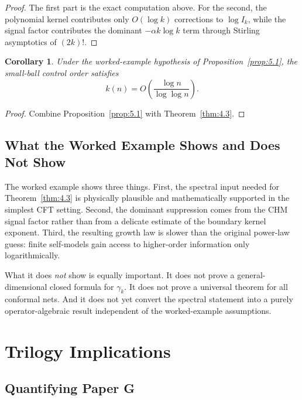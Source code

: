 \documentclass[12pt]{article}
\newtheorem{corollary}[theorem]{Corollary}
\theoremstyle{definition}
\theoremstyle{remark}
\begin{document}
\begin{proof}
The first part is the exact computation above. For the second, the
polynomial kernel contributes only \(O(\log k)\) corrections to
\(\log I_k\), while the signal factor contributes the dominant
\(-\alpha k\log k\) term through Stirling asymptotics of \((2k)!\).
\end{proof}

\begin{corollary}\label{cor:5.2}
Under the worked-example hypothesis of
Proposition~\ref{prop:5.1}, the small-ball control order satisfies
\[
k(n)=O\!\left(\frac{\log n}{\log\log n}\right).
\]
\end{corollary}

\begin{proof}
Combine Proposition~\ref{prop:5.1} with
Theorem~\ref{thm:4.3}.
\end{proof}

\subsection{What the Worked Example Shows and Does Not Show}
\label{subsec:5.4}

The worked example shows three things. First, the spectral input needed
for Theorem~\ref{thm:4.3} is physically plausible and mathematically
supported in the simplest CFT setting. Second, the dominant suppression
comes from the CHM signal factor rather than from a delicate estimate of
the boundary kernel exponent. Third, the resulting growth law is slower
than the original power-law guess: finite self-models gain access to
higher-order information only logarithmically.

What it does \emph{not} show is equally important. It does not prove a
general-dimensional closed formula for \(\gamma_k\). It does not prove
a universal theorem for all conformal nets. And it does not yet convert
the spectral statement into a purely operator-algebraic result
independent of the worked-example assumptions.

\section{Trilogy Implications}\label{sec:6}

\subsection{Quantifying Paper G}\label{subsec:6.1}
\end{document}
